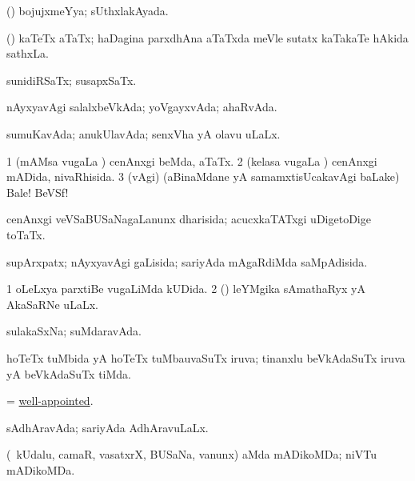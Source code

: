 \bentry
{} 
\gl{\gu}
\expl{}
\bmng
(\AmA) bojujxmeYya; sUthxlakAyada. 
\emng
\eentry

\bentry
{} 
\gl{\nA}
\expl{}
\bmng
(\nw) kaTeTx aTaTx; haDagina parxdhAna aTaTxda meVle sutatx kaTakaTe hAkida sathxLa. 
\emng
\eentry

\bentry
{} 
\gl{\gu}
\expl{}
\bmng
sunidiRSaTx; susapxSaTx. 
\emng
\eentry

\bentry
{} 
\gl{\gu}
\bmng
nAyxyavAgi salalxbeVkAda; yoVgayxvAda; ahaRvAda. 
\emng
\eentry

\bentry
{} 
\gl{\gu}
\expl{}
\bmng
sumuKavAda; anukUlavAda; senxVha yA olavu uLaLx. 
\emng
\eentry

\bentry
{} 
\gl{\gu}
\expl{}
\bmng
\bnum
\num{1} (mAMsa \mo vugaLa \vi) cenAnxgi beMda, aTaTx. 
\num{2} (kelasa \mo vugaLa \vi) cenAnxgi mADida, nivaRhisida. 
\num{3} (\BAavayx vAgi) (aBinaMdane yA samamxtisUcakavAgi baLake) Bale! BeVSf! 
\enum
\emng
\eentry

\bentry
{} 
\gl{\gu}
\expl{}
\bmng
cenAnxgi veVSaBUSaNagaLanunx dharisida; acucxkaTATxgi uDigetoDige toTaTx. 
\emng
\eentry

\bentry
{} 
\gl{\gu}
\expl{}
\bmng
supArxpatx; nAyxyavAgi gaLisida; sariyAda mAgaRdiMda saMpAdisida. 
\emng
\eentry

\bentry
{} 
\gl{\gu}
\expl{}
\bmng
\bnum
\num{1} oLeLxya parxtiBe \mo vugaLiMda kUDida. 
\num{2} (\AmA) leYMgika sAmathaRyx yA AkaSaRNe uLaLx. 
\enum
\emng
\eentry

\bentry
{} 
\gl{\gu}
\expl{}
\bmng
sulakaSxNa; suMdaravAda. 
\emng
\eentry

\bentry
{} 
\gl{\gu}
\expl{}
\bmng
hoTeTx tuMbida yA hoTeTx tuMbauvaSuTx iruva; tinanxlu beVkAdaSuTx iruva yA beVkAdaSuTx tiMda. 
\emng
\eentry

\bentry
{} 
\gl{\gu}
\expl{}
\bmng
= \hyperlink{well-appointed}{well-appointed}. 
\emng
\eentry

\bentry
{} 
\gl{\gu}
\expl{}
\bmng
sAdhAravAda; sariyAda AdhAravuLaLx. 
\emng
\eentry

\bentry
{} 
\gl{\gu}
\expl{}
\bmng
(\kanmu\ kUdalu, camaR, vasatxrX, BUSaNa, \mo vanunx) aMda mADikoMDa; niVTu mADikoMDa. 
\emng
\eentry

